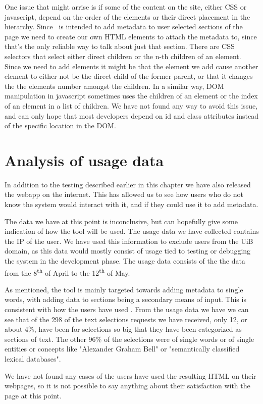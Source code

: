 One issue that might arrise is if some of the content on the site, either CSS or javascript,
depend on the order of the elements or their direct placement in the hierarchy.
Since \theartefact\ is intended to add metadata to user selected sections of the page we need to create our own
HTML elements to attach the metadata to, since that's the only reliable way to talk about just that section.
There are CSS selectors that select either direct children or the n-th children of an element.
Since we need to add elements it might be that the element we add cause another element to either not be the direct
child of the former parent, or that it changes the the elements number amongst the children.
In a similar way, DOM manipulation in javascript sometimes uses the children of an element or the index of an element
in a list of children.
We have not found any way to avoid this issue,
and can only hope that most developers depend on id and class attributes instead of the specific location in the DOM.

\section{Analysis of usage data}
In addition to the testing described earlier in this chapter we have also released the webapp on the internet.
This has allowed us to see how users who do not know the system would interact with it,
and if they could use it to add metadata.

The data we have at this point is inconclusive, but can hopefully give some indication of how the tool will be used.
The usage data we have collected contains the IP of the user.
We have used this information to exclude users from the UiB domain,
as this data would mostly consist of usage tied to testing or debugging the system in the development phase.
The usage data consists of the the data from the 8\textsuperscript{th}	 of April to the 12\textsuperscript{th} of May.

As mentioned, the tool is mainly targeted towards adding metadata to single words, with adding data to sections being
a secondary means of input.
This is consistent with how the users have used \theartefact.
From the usage data we have we can see that of the 298 of the text selections requests we have received,
only 12, or about 4\%, have been for selections so big that they have been categorized as sections of text.
The other 96\% of the selections were of single words or of single entities or concepts like "Alexander Graham Bell" or
"semantically classified lexical databases".

We have not found any cases of the users have used the resulting HTML on their webpages,
so it is not possible to say anything about their satisfaction with the page at this point.
